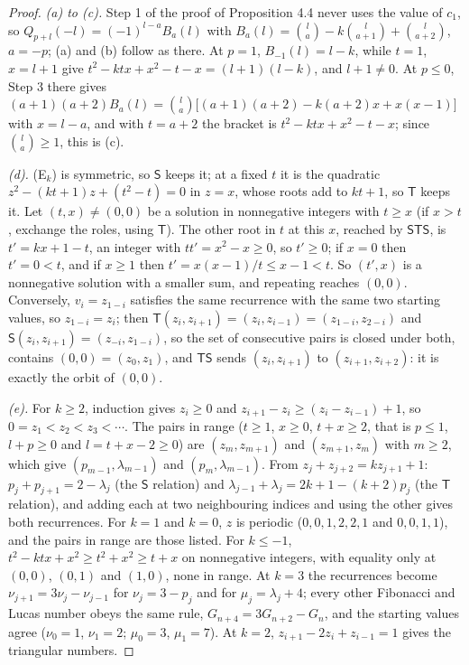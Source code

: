 \documentclass[11pt]{article}
\begin{document}
\begin{proof}
\emph{(a) to (c).} Step 1 of the proof of Proposition 4.4 never uses the value of $c_1$, so $Q_{p+l}(-l)=(-1)^{l-a}B_a(l)$ with $B_a(l)=\binom{l}{a}-k\binom{l}{a+1}+\binom{l}{a+2}$, $a=-p$; (a) and (b) follow as there. At $p=1$, $B_{-1}(l)=l-k$, while $t=1$, $x=l+1$ give $t^2-ktx+x^2-t-x=(l+1)(l-k)$, and $l+1\ne0$. At $p\le0$, Step 3 there gives $(a+1)(a+2)B_a(l)=\binom{l}{a}\bigl[(a+1)(a+2)-k(a+2)x+x(x-1)\bigr]$ with $x=l-a$, and with $t=a+2$ the bracket is $t^2-ktx+x^2-t-x$; since $\binom{l}{a}\ge1$, this is (c).

\emph{(d).} (E$_k$) is symmetric, so $\mathsf{S}$ keeps it; at a fixed $t$ it is the quadratic $z^2-(kt+1)z+(t^2-t)=0$ in $z=x$, whose roots add to $kt+1$, so $\mathsf{T}$ keeps it. Let $(t,x)\ne(0,0)$ be a solution in nonnegative integers with $t\ge x$ (if $x>t$, exchange the roles, using $\mathsf{T}$). The other root in $t$ at this $x$, reached by $\mathsf{S}\mathsf{T}\mathsf{S}$, is $t'=kx+1-t$, an integer with $tt'=x^2-x\ge0$, so $t'\ge0$; if $x=0$ then $t'=0<t$, and if $x\ge1$ then $t'=x(x-1)/t\le x-1<t$. So $(t',x)$ is a nonnegative solution with a smaller sum, and repeating reaches $(0,0)$. Conversely, $v_i=z_{1-i}$ satisfies the same recurrence with the same two starting values, so $z_{1-i}=z_i$; then $\mathsf{T}(z_i,z_{i+1})=(z_i,z_{i-1})=(z_{1-i},z_{2-i})$ and $\mathsf{S}(z_i,z_{i+1})=(z_{-i},z_{1-i})$, so the set of consecutive pairs is closed under both, contains $(0,0)=(z_0,z_1)$, and $\mathsf{T}\mathsf{S}$ sends $(z_i,z_{i+1})$ to $(z_{i+1},z_{i+2})$: it is exactly the orbit of $(0,0)$.

\emph{(e).} For $k\ge2$, induction gives $z_i\ge0$ and $z_{i+1}-z_i\ge(z_i-z_{i-1})+1$, so $0=z_1<z_2<z_3<\cdots$. The pairs in range ($t\ge1$, $x\ge0$, $t+x\ge2$, that is $p\le1$, $l+p\ge0$ and $l=t+x-2\ge0$) are $(z_m,z_{m+1})$ and $(z_{m+1},z_m)$ with $m\ge2$, which give $(p_{m-1},\lambda_{m-1})$ and $(p_m,\lambda_{m-1})$. From $z_j+z_{j+2}=kz_{j+1}+1$: $p_j+p_{j+1}=2-\lambda_j$ (the $\mathsf{S}$ relation) and $\lambda_{j-1}+\lambda_j=2k+1-(k+2)p_j$ (the $\mathsf{T}$ relation), and adding each at two neighbouring indices and using the other gives both recurrences. For $k=1$ and $k=0$, $z$ is periodic ($0,0,1,2,2,1$ and $0,0,1,1$), and the pairs in range are those listed. For $k\le-1$, $t^2-ktx+x^2\ge t^2+x^2\ge t+x$ on nonnegative integers, with equality only at $(0,0)$, $(0,1)$ and $(1,0)$, none in range. At $k=3$ the recurrences become $\nu_{j+1}=3\nu_j-\nu_{j-1}$ for $\nu_j=3-p_j$ and for $\mu_j=\lambda_j+4$; every other Fibonacci and Lucas number obeys the same rule, $G_{n+4}=3G_{n+2}-G_n$, and the starting values agree ($\nu_0=1$, $\nu_1=2$; $\mu_0=3$, $\mu_1=7$). At $k=2$, $z_{i+1}-2z_i+z_{i-1}=1$ gives the triangular numbers.
\end{proof}
\end{document}
